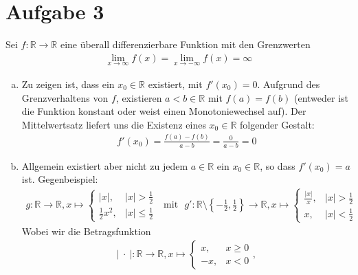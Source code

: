 \documentclass{scrreprt}
\newcommand{\RR}{\mathbb{R}}
\newcommand{\round}[1]{\left(#1\right)}
\newcommand{\curly}[1]{\left\lbrace#1\right\rbrace}
\newcommand{\abs}[1]{\left\vert#1\right\vert}
\begin{document}
\section*{Aufgabe 3}
Sei $f \colon \RR \to \RR$ eine überall differenzierbare Funktion mit den Grenzwerten
\begin{align*}
    \lim\limits_{x \to \infty} f\round{x} = \lim\limits_{x \to -\infty} f\round{x} = \infty
\end{align*}
\begin{enumerate}[(a)]
\item
    Zu zeigen ist, dass ein $x_0 \in \RR$ existiert, mit $f'(x_0) = 0$. Aufgrund des Grenzverhaltens von $f$, existieren $a < b \in \RR$ mit $f\round{a} = f\round{b}$ (entweder ist die Funktion konstant oder weist einen Monotoniewechsel auf). Der Mittelwertsatz liefert uns die Existenz eines $x_0 \in \RR$ folgender Gestalt:
    \begin{align*}
        f'(x_0) = \frac{f(a) - f(b)}{a-b} = \frac{0}{a-b} = 0
    \end{align*}
\item
    Allgemein existiert aber nicht zu jedem $a \in \RR$ ein $x_0 \in \RR$, so dass $f'(x_0) = a$ ist. Gegenbeispiel:
    \begin{align*}
        g \colon \RR \to \RR, x \mapsto \begin{cases} 
                                            \abs{x}, & \abs{x} > \frac{1}{2}\\
                                            \frac{1}{2}x^2,& \abs{x} \leq \frac{1}{2}
                                        \end{cases}
        ~~~ \text{mit} ~~~
        g' \colon \RR\setminus\curly{-\frac{1}{2}, \frac{1}{2}} \to \RR, x \mapsto \begin{cases} 
                                            \frac{\abs{x}}{x}, & \abs{x} > \frac{1}{2}\\
                                            x ,& \abs{x} < \frac{1}{2}
                                        \end{cases}
    \end{align*}
    Wobei wir die Betragsfunktion
    \begin{align*}
        \abs{\ \cdot \ }\colon \RR \to \RR, x \mapsto \begin{cases} 
                                            x, & x \geq 0\\
                                            -x,& x<0
                                        \end{cases},\\

\end{align*}
\end{enumerate}
\end{document}
